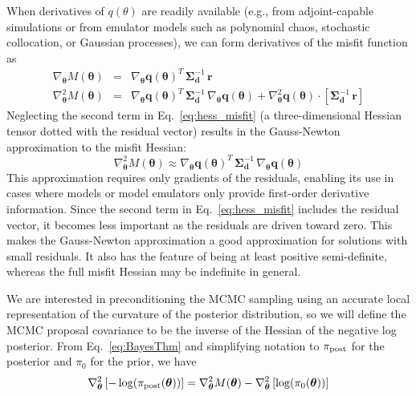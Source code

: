 When derivatives of $q(\theta)$ are readily available (e.g.,
from adjoint-capable simulations or from emulator models such as
polynomial chaos, stochastic collocation, or Gaussian processes), we
can form derivatives of the misfit function as
\begin{eqnarray}
\nabla_{\boldsymbol{\theta}} M(\boldsymbol{\theta}) &=& \nabla_{\boldsymbol{\theta}} \boldsymbol{q}(\boldsymbol{\theta})^T\,\boldsymbol{\Sigma}_{\boldsymbol{d}}^{-1}\,\boldsymbol{r} \label{eq:grad_misfit} \\
\nabla^2_{\boldsymbol{\theta}} M(\boldsymbol{\theta}) &=& \nabla_{\boldsymbol{\theta}} \boldsymbol{q}(\boldsymbol{\theta})^T\,\boldsymbol{\Sigma}_{\boldsymbol{d}}^{-1}\,\nabla_{\boldsymbol{\theta}} \boldsymbol{q}(\boldsymbol{\theta}) + \nabla^2_{\boldsymbol{\theta}} \boldsymbol{q}(\boldsymbol{\theta}) \cdot \left[\boldsymbol{\Sigma}_{\boldsymbol{d}}^{-1}\,\boldsymbol{r}\right] \label{eq:hess_misfit}
\end{eqnarray}
Neglecting the second term in Eq.~\ref{eq:hess_misfit} (a
three-dimensional Hessian tensor dotted with the residual vector)
results in the Gauss-Newton approximation to the misfit Hessian:
\begin{equation}
\nabla^2_{\boldsymbol{\theta}} M(\boldsymbol{\theta}) \approx \nabla_{\boldsymbol{\theta}} \boldsymbol{q}(\boldsymbol{\theta})^T\,\boldsymbol{\Sigma}_{\boldsymbol{d}}^{-1}\,\nabla_{\boldsymbol{\theta}} \boldsymbol{q}(\boldsymbol{\theta}) \label{eq:hess_misfit_gn}
\end{equation}
This approximation requires only gradients of the residuals, enabling
its use in cases where models or model emulators only provide
first-order derivative information.  Since the second term in
Eq.~\ref{eq:hess_misfit} includes the residual vector, it becomes less
important as the residuals are driven toward zero.  This makes the
Gauss-Newton approximation a good approximation for solutions with
small residuals.  It also has the feature of being at least positive
semi-definite, whereas the full misfit Hessian may be indefinite in general.


We are interested in preconditioning the MCMC sampling using an
accurate local representation of the curvature of the posterior
distribution, so we will define the MCMC proposal covariance to be the
inverse of the Hessian of the negative log posterior.  From
Eq.~\ref{eq:BayesThm} and simplifying notation to $\pi_{\rm post}$ for
the posterior and $\pi_0$ for the prior, we have
\begin{equation}
\nabla^2_{\boldsymbol{\theta}} 
  \left[ -\log(\pi_{\rm post}(\boldsymbol{\theta})) \right] = 
  \nabla^2_{\boldsymbol{\theta}} M(\boldsymbol{\theta}) - 
  \nabla^2_{\boldsymbol{\theta}} \left[ \log(\pi_0(\boldsymbol{\theta})) \right] 
\label{eq:hess_post}
\end{equation}

